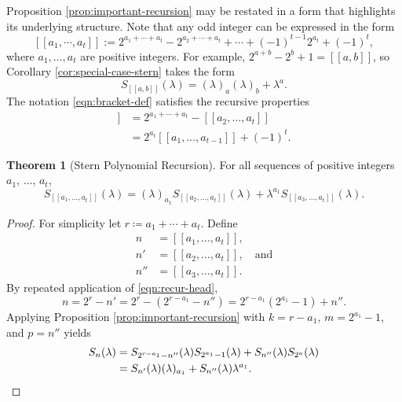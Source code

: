 \documentclass[11pt]{article}
\theoremstyle{definition}
\newtheorem{thm}{Theorem}
\newcommand{\stern}[2]{S_{#1}(#2)}
\newcommand{\lm}{\lambda}
\begin{document}
Proposition \ref{prop:important-recursion} may be restated in a form that highlights its underlying structure.  Note that any odd integer can be expressed in the form
\begin{equation}\label{eqn:bracket-def}
	[[a_1,\cdots, a_t]] := 2^{a_1 + \cdots + a_t} - 2^{a_2 + \cdots + a_t} + \cdots + (-1)^{t-1}2^{a_t} + (-1)^t,
\end{equation}
where $a_1,\ldots, a_t$ are positive integers.  For example, $2^{a+b} - 2^b + 1 = [[a,b]]$, so Corollary \ref{cor:special-case-stern} takes the form
\begin{equation}\label{eqn:special-case-exmp}
	\stern{[[a,b]]}\lm = (\lm)_a(\lm)_b + \lm^a.
\end{equation}
The notation \eqref{eqn:bracket-def} satisfies the recursive properties
\begin{align}
	[[a_1,\ldots, a_{t-1},a_t]] &= 2^{a_1 + \cdots + a_t} - [[a_2,\ldots, a_t]] \label{eqn:recur-head}\\
	&= 2^{a_t} [[a_1,\ldots, a_{t-1}]]+ (-1)^t.\label{eqn:recur-tail}
\end{align}

\begin{thm}[Stern Polynomial Recursion]\label{thm:stern-poly-recursion}
	For all sequences of positive integers $a_1$, $\ldots$, $a_t$,
	\begin{equation}\label{eqn:stern-recursion}
		\stern{[[a_1,\ldots, a_t]]}\lm =
		(\lm)_{a_1}\stern{[[a_2,\ldots, a_t]]}\lm + \lm^{a_1}\stern{[[a_3,\ldots, a_t]]}\lm.
	\end{equation}
\end{thm}

\begin{proof}
	For simplicity let $r \coloneqq a_1 + \cdots + a_t$.  Define
	\begin{align*}
		n &= [[a_1,\ldots, a_t]],\\
		n' &= [[a_2,\ldots, a_t]],\quad\text{and}\\
		n'' &= [[a_3,\ldots, a_t]].
	\end{align*}
	By repeated application of \eqref{eqn:recur-head},
	\[
	n = 2^r - n' = 2^r - (2^{r-a_1} - n'') = 2^{r - a_1}(2^{a_1} - 1) + n''.
	\]
	Applying Proposition \ref{prop:important-recursion} with $k = r - a_1$, $m = 2^{a_1} - 1$, and $p = n''$ yields
	\begin{align*}
		\stern{n}\lm &= \stern{2^{r-a_1} - n''}\lm \stern{2^{a_1} -1}\lm + \stern{n''}\lm \stern{2^a}\lm \\
		&= \stern{n'}\lm(\lm)_{a_1} + \stern{n''}\lm \lm^{a_1}.\qedhere
	\end{align*}
\end{proof}
\end{document}
